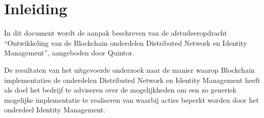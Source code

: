 \chapter*{Inleiding}

In dit document wordt de aanpak beschreven van de afstudeeropdracht “Ontwikkeling van de Blockchain onderdelen Distributed Network en Identity Management”, aangeboden door Quintor. 

De resultaten van het uitgevoerde onderzoek naar de manier waarop Blockchain implementaties de onderdelen Distributed Network en Identity Management heeft als doel het bedrijf te adviseren over de mogelijkheden om een zo generiek mogelijke implementatie te realiseren van waarbij acties beperkt worden door het onderdeel Identity Management.
